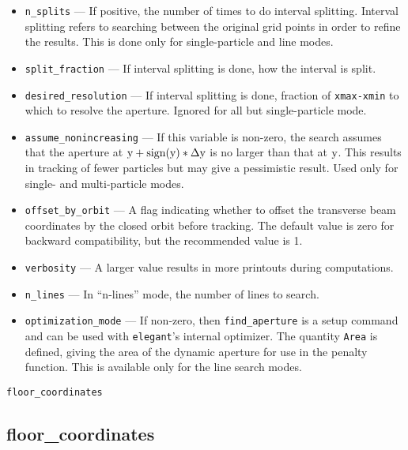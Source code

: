 \documentclass[11pt]{article}
\begin{document}
\begin{itemize}
\item \verb|n_splits| --- If positive, the number of times to do
interval splitting.  Interval splitting refers to searching between
the original grid points in order to refine the results.  This is done
only for single-particle and line modes.

\item \verb|split_fraction| --- If interval splitting is done, how the interval is split.

\item \verb|desired_resolution| --- If interval splitting is done,
fraction of \verb|xmax-xmin| to which to resolve the aperture.  Ignored for all but single-particle
mode.

\item \verb|assume_nonincreasing| --- If this variable is non-zero, the search assumes that the aperture
at ${\rm y+sign(y)*\Delta y}$ is no larger than that at ${\rm y}$.  This results in tracking of
fewer particles but may give a pessimistic result.    Used only for single- and multi-particle
modes.

\item \verb|offset_by_orbit| --- A flag indicating whether to offset
the transverse beam coordinates by the closed orbit before tracking.  The default value is
zero for backward compatibility, but the recommended value is 1.

\item \verb|verbosity| --- A larger value results in more printouts during computations.

\item \verb|n_lines| --- In ``n-lines'' mode, the number of lines to search.

\item \verb|optimization_mode| --- If non-zero, then \verb|find_aperture| is a setup command and can be used
with {\tt elegant}'s internal optimizer.  The quantity \verb|Area| is defined, giving the area of the dynamic
aperture for use in the penalty function.  This is available only for the line search modes.

\end{itemize}

\begin{latexonly}
\newpage
\begin{center}{\Large\verb|floor_coordinates|}\end{center}
\end{latexonly}
\subsection{floor\_coordinates \label{subsec:floorcoordinates}}
\end{document}
